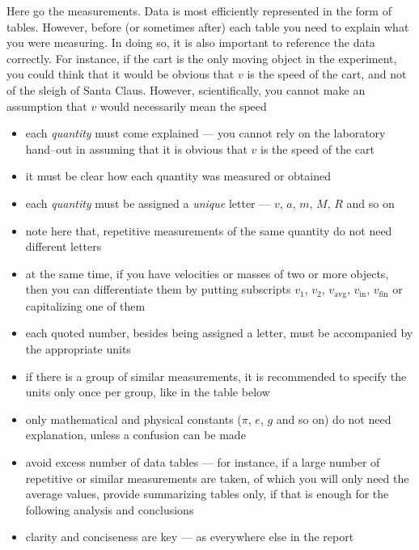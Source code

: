 \documentclass[epsfig,12pt]{article}
\begin{document}
	Here go the measurements.
	Data is most efficiently represented in the form of tables.
	However, before (or sometimes after) each table you need to explain what you were measuring.
	In doing so, it is also important to reference the data correctly.
	For instance, if the cart is the only moving object in the experiment, you could think
	that it would be obvious that $ v $ is the speed of the cart, and not of the sleigh of Santa Claus.
	However, scientifically, you cannot make an assumption that $ v $ would necessarily mean the speed
\begin{itemize}
\item
	each \emph{quantity} must come explained --- you cannot rely on the laboratory hand--out in assuming
	that it is obvious that $ v $ is the speed of the cart

\item
	it must be clear how each quantity was measured or obtained

\item
	each \emph{quantity} must be assigned a \emph{unique} letter --- $ v $, $ a $, $ m $, $ M $, $ R $ and so on

\item
	note here that, repetitive measurements of the same quantity do not need different letters

\item
	at the same time, if you have velocities or masses of two or more objects, then you can differentiate
	them by putting subscripts $ v_1 $, $ v_2 $, $ v_\text{avg} $, $ v_\text{in} $, $ v_\text{fin} $ or capitalizing one of them

\item
	each quoted number, besides being assigned a letter, must be accompanied by the appropriate units

\item
	if there is a group of similar measurements, it is recommended to specify the units
	only once per group, like in the table below

\item
	only mathematical and physical constants ($ \pi $, $ e $, $ g $ and so on) do not need explanation, unless a confusion can be made

\item
	avoid excess number of data tables --- for instance, if a large number of repetitive or similar measurements are taken,
	of which you will only need the average values,
	provide summarizing tables only, if that is enough for the following analysis and conclusions

\item
	clarity and conciseness are key --- as everywhere else in the report
\end{itemize}
\end{document}
